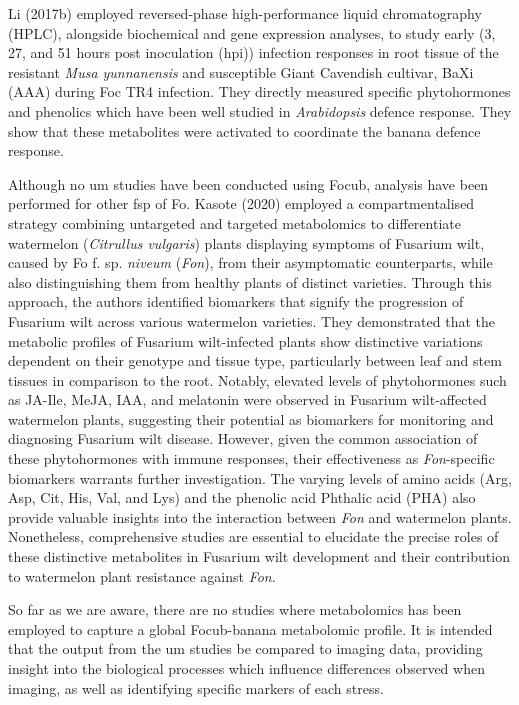 Li \et (2017b) employed reversed-phase high-performance liquid chromatography (HPLC), alongside biochemical and gene expression analyses, to study early (3, 27, and 51 hours post inoculation (hpi)) infection responses in root tissue of the resistant \textit{Musa yunnanensis} and susceptible Giant Cavendish cultivar, BaXi (\Musa AAA) during Foc TR4 infection. They directly measured specific phytohormones and phenolics which have been well studied in \textit{Arabidopsis} defence response. They show that these metabolites were activated to coordinate the banana defence response.

Although no \ac{um} studies have been conducted using \ac{Focub}, analysis have been performed for other \ac{fsp} of \ac{Fo}. Kasote \et (2020) employed a compartmentalised strategy combining untargeted and targeted metabolomics to differentiate watermelon (\textit{Citrullus vulgaris}) plants displaying symptoms of Fusarium wilt, caused by \ac{Fo} f. sp. \textit{niveum} (\textit{Fon}), from their asymptomatic counterparts, while also distinguishing them from healthy plants of distinct varieties. Through this approach, the authors identified biomarkers that signify the progression of Fusarium wilt across various watermelon varieties. They demonstrated that the metabolic profiles of Fusarium wilt-infected plants show distinctive variations dependent on their genotype and tissue type, particularly between leaf and stem tissues in comparison to the root. Notably, elevated levels of phytohormones such as JA-Ile, MeJA, IAA, and melatonin were observed in Fusarium wilt-affected watermelon plants, suggesting their potential as biomarkers for monitoring and diagnosing Fusarium wilt disease. However, given the common association of these phytohormones with immune responses, their effectiveness as \textit{Fon}-specific biomarkers warrants further investigation. The varying levels of amino acids (Arg, Asp, Cit, His, Val, and Lys) and the phenolic acid Phthalic acid (PHA) also provide valuable insights into the interaction between \textit{Fon} and watermelon plants. Nonetheless, comprehensive studies are essential to elucidate the precise roles of these distinctive metabolites in Fusarium wilt development and their contribution to watermelon plant resistance against \textit{Fon}.

So far as we are aware, there are no studies where metabolomics has been employed to capture a global \ac{Focub}-banana metabolomic profile. It is intended that the output from the \ac{um} studies be compared to imaging data, providing insight into the biological processes which influence differences observed when imaging, as well as identifying specific markers of each stress.

